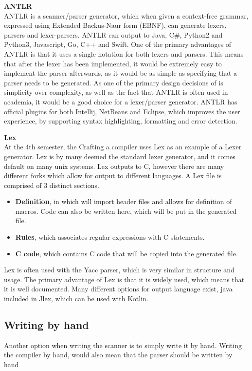 \textbf{ANTLR}\\
ANTLR is a scanner/parser generator, which when given a context-free grammar, expressed using Extended Backus-Naur form (EBNF), can generate lexers, parsers and lexer-parsers\cite{ANTLR}.
ANTLR can output to Java, C\#, Python2 and Python3, Javascript, Go, C++ and Swift\cite{ANTLRDocsTargets}.
One of the primary advantages of ANTLR is that it uses a single notation for both lexers and parsers\cite{ANTLRDocs}.
This means that after the lexer has been implemented, it would be extremely easy to implement the parser afterwards, as it would be as simple as specifying that a parser needs to be generated.
As one of the primary design decisions of is simplicity over complexity, as well as the fact that ANTLR is often used in academia, it would be a good choice for a lexer/parser generator.
ANTLR has official plugins for both Intellij, NetBeans and Eclipse, which improves the user experience, by supporting syntax highlighting, formatting and error detection.

\textbf{Lex}\\
At the 4th semester, the Crafting a compiler uses Lex as an example of a Lexer generator\cite{CraftingACompiler}.
Lex is by many deemed the standard lexer generator, and it comes default on many unix systems.
Lex outputs to C, however there are many different forks which allow for output to different languages.
A Lex file is comprised of 3 distinct sections\cite{Lex}.
\begin{itemize}
	\item \textbf{Definition}, in which will import header files and allows for definition of macros. 
	Code can also be written here, which will be put in the generated file.
	\item \textbf{Rules}, which associates regular expressions with C statements.
	\item \textbf{C code}, which contains C code that will be copied into the generated file.
\end{itemize}
Lex is often used with the Yacc parser, which is very similar in structure and usage.
The primary advantage of Lex is that it is widely used, which means that it is well documented.
Many different options for output language exist, java included in Jlex\cite{JLex}, which can be used with Kotlin.

\subsection{Writing by hand}
Another option when writing the scanner is to simply write it by hand.
Writing the compiler by hand, would also mean that the parser should be written by hand

